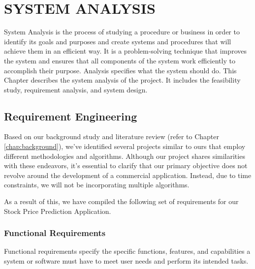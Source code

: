 \documentclass[./main.tex]{subfiles}
\begin{document}
\chapter{ SYSTEM ANALYSIS}
\noindent
System Analysis is the process of studying a procedure or business in order to identify its goals and purposes and create systems and procedures that will achieve them in an efficient way. It is a problem-solving technique that improves the system and ensures that all components of the system work efficiently to accomplish their purpose. 
Analysis specifies what the system should do. This Chapter describes the system analysis of the project. It includes the feasibility study, requirement analysis, and system design.
\section{Requirement Engineering}
Based on our background study and literature review (refer to Chapter \ref{chap:background}), we've identified several projects similar to ours that employ different methodologies and algorithms. Although our project shares similarities with these endeavors, it's essential to clarify that our primary objective does not revolve around the development of a commercial application. Instead, due to time constraints, we will not be incorporating multiple algorithms.

\noindent
As a result of this, we have compiled the following set of requirements for our Stock Price Prediction Application.
\subsection{Functional Requirements}
Functional requirements specify the specific functions, features, and capabilities a system or software must have to meet user needs and perform its intended tasks.
\end{document}
